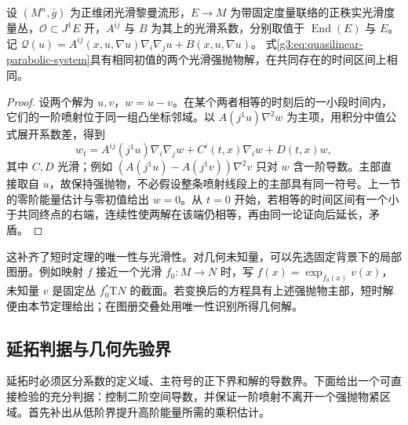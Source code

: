 \begin{proposition}\label{g3:prop:quasilinear-parabolic-uniqueness}
	设 \((M^n,\bar g)\) 为正维闭光滑黎曼流形，\(E\to M\) 为带固定度量联络的正秩实光滑度量丛，\(\mathcal O\subset J^1E\) 开，\(A^{ij}\) 与 \(B\) 为其上的光滑系数，分别取值于 \(\operatorname{End}(E)\) 与 \(E\)。记 \(\mathcal Q(u)=A^{ij}(x,u,\nabla u)\nabla_i\nabla_ju+B(x,u,\nabla u)\)。
	式\eqref{g3:eq:quasilinear-parabolic-system}具有相同初值的两个光滑强抛物解，在共同存在的时间区间上相同。
\end{proposition}
\begin{proof}
	设两个解为 \(u,v\)，\(w=u-v\)。在某个两者相等的时刻后的一小段时间内，它们的一阶喷射位于同一组凸坐标邻域。以 \(A(j^1u)\nabla^2w\) 为主项，用积分中值公式展开系数差，得到
	\[
		w_t=A^{ij}(j^1u)\nabla_i\nabla_jw+C^i(t,x)\nabla_iw+D(t,x)w,
	\]
	其中 \(C,D\) 光滑；例如 \((A(j^1u)-A(j^1v))\nabla^2v\) 只对 \(w\) 含一阶导数。主部直接取自 \(u\)，故保持强抛物，不必假设整条喷射线段上的主部具有同一符号。上一节的零阶能量估计与零初值给出 \(w=0\)。从 \(t=0\) 开始，若相等的时间区间有一个小于共同终点的右端，连续性使两解在该端仍相等，再由同一论证向后延长，矛盾。
\end{proof}

这补齐了短时定理的唯一性与光滑性。对几何未知量，可以先选固定背景下的局部图册。例如映射 \(f\) 接近一个光滑 \(f_0:M\to N\) 时，写 \(f(x)=\exp_{f_0(x)}v(x)\)，未知量 \(v\) 是固定丛 \(f_0^*\mathrm TN\) 的截面。若变换后的方程具有上述强抛物主部，短时解便由本节定理给出；在图册交叠处用唯一性识别所得几何解。

\subsection{延拓判据与几何先验界}
\label{g3:subsec:2602:04}
延拓时必须区分系数的定义域、主符号的正下界和解的导数界。下面给出一个可直接检验的充分判据：控制二阶空间导数，并保证一阶喷射不离开一个强抛物紧区域。首先补出从低阶界提升高阶能量所需的乘积估计。

